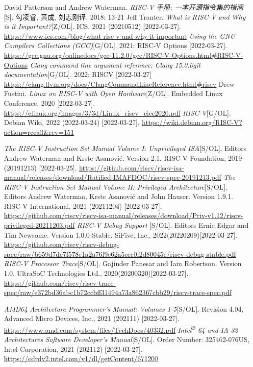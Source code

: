 \documentclass[UTF8,fontset=none,linespread=1.15]{ctexart}
\begin{document}
\begin{thebibliography}{99}
 David Patterson and Andrew Waterman. \textit{RISC-V 手册: 一本开源指令集的指南}[S]. 勾凌睿, 黄成, 刘志刚译. 2018: 13-21
 Jeff Tranter. \textit{What is RISC-V and Why is it Important?}[Z/OL]. ICS. 2021 (20210512) [2022-03-27]. \url{https://www.ics.com/blog/what-risc-v-and-why-it-important}
 \textit{Using the GNU Compilers Collections (GCC)}[G/OL]. 2021: RISC-V Options [2022-03-27]. \url{https://gcc.gnu.org/onlinedocs/gcc-11.2.0/gcc/RISC-V-Options.html#RISC-V-Options}
 \textit{Clang command line argument reference: Clang 15.0.0git documentation}[G/OL]. 2022: RISCV [2022-03-27] \url{https://clang.llvm.org/docs/ClangCommandLineReference.html#riscv}
 Drew Fustini. \textit{Linux on RISC-V
with Open Hardware}[Z/OL]. Embedded Linux Conference, 2020 [2022-03-27]. \url{https://elinux.org/images/3/3d/Linux_riscv_elce2020.pdf}
 \textit{RISC-V}[G/OL]. Debian Wiki, 2022 (2022-03-24) [2022-03-27]. \url{https://wiki.debian.org/RISC-V?action=recall&rev=151}

 \textit{The RISC-V Instruction Set Manual
Volume I: Unprivileged ISA}[S/OL]. Editors Andrew Waterman and Krste Asanović. Version 2.1. RISC-V Foundation, 2019 (20191213) [2022-03-25]. \url{https://github.com/riscv/riscv-isa-manual/releases/download/Ratified-IMAFDQC/riscv-spec-20191213.pdf}
 \textit{The RISC-V Instruction Set Manual
Volume II: Privileged Architecture}[S/OL]. Editors Andrew Waterman, Krste Asanović and John Hauser.
Version 1.9.1. RISC-V International, 2021 (20211204) [2022-03-27]. \url{https://github.com/riscv/riscv-isa-manual/releases/download/Priv-v1.12/riscv-privileged-20211203.pdf}
 \textit{RISC-V Debug Support
}[S/OL]. Editors Ernie Edgar and Tim Newsome. Version 1.0.0-Stable. SiFive, Inc., 2022(20220209)[2022-03-27]. \url{https://github.com/riscv/riscv-debug-spec/raw/b659d7dc7f578e1a2a76f9e62a5eec0f2d80045c/riscv-debug-stable.pdf}
 \textit{RISC-V Processor Trace}[S/OL]. Gajinder Panesar and
Iain Robertson. Version 1.0. UltraSoC Technologies Ltd., 2020(20200320)[2022-03-27]. \url{https://github.com/riscv/riscv-trace-spec/raw/e372bd36abc1b72ccbff31494a73a862367cbb29/riscv-trace-spec.pdf}

 \textit{AMD64 Architecture Programmer's Manual: Volumes 1-5}[S/OL]. Revision 4.04, Advanced Micro Devices, Inc., 2021 (202111) [2022-03-27]. \url{https://www.amd.com/system/files/TechDocs/40332.pdf}
 \textit{Intel\textsuperscript{®} 64 and IA-32 Architectures Software Developer’s Manual}[S/OL]. Order Number: 325462-076US, Intel Corporation, 2021 (202112) [2022-03-27]. \url{https://cdrdv2.intel.com/v1/dl/getContent/671200}


\end{thebibliography}
\end{document}
